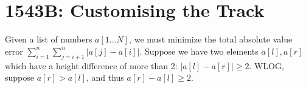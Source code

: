 \section{1543B: Customising the Track}
Given a list of numbers $a[1\dots N]$, we must minimize the total absolute value
error $\sum_{i=1}^n \sum_{j=i+1}^n |a[j] - a[i]|$. Suppose we have two elements $a[l], a[r]$
which have a height difference of more than 2: $|a[l] - a[r]| \geq 2$. WLOG, suppose $a[r] > a[l]$,
and thus $a[r] - a[l] \geq 2$.
